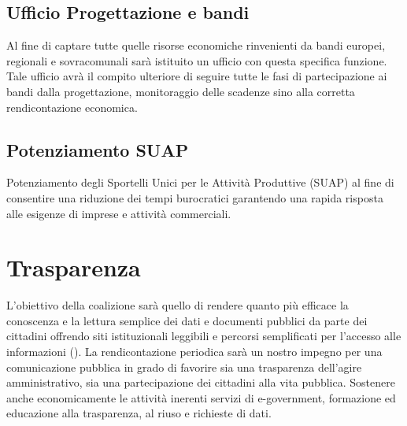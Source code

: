 \documentclass[a4paper,14pt,italian]{sphinxmanual}
\begin{document}
\section{Ufficio Progettazione e bandi}
\label{\detokenize{comune_efficiente:ufficio-progettazione-e-bandi}}
Al fine di captare tutte quelle risorse economiche rinvenienti da bandi europei, regionali e sovracomunali sarà istituito un ufficio con questa specifica funzione.
Tale ufficio avrà il compito ulteriore di seguire tutte le fasi di partecipazione ai bandi dalla progettazione, monitoraggio delle scadenze sino alla corretta rendicontazione economica.


\section{Potenziamento SUAP}
\label{\detokenize{comune_efficiente:potenziamento-suap}}
Potenziamento degli Sportelli Unici per le Attività Produttive (SUAP) al fine di consentire una riduzione dei tempi burocratici garantendo una rapida risposta alle esigenze di imprese e attività commerciali.


\chapter{Trasparenza}
\label{\detokenize{trasparenza:trasparenza}}\label{\detokenize{trasparenza::doc}}


L’obiettivo della coalizione sarà quello di rendere quanto più efficace la conoscenza e la lettura semplice dei dati e documenti pubblici da parte dei cittadini offrendo siti istituzionali leggibili e percorsi semplificati per l’accesso alle informazioni ().
La rendicontazione periodica sarà un nostro impegno per una comunicazione pubblica in grado di favorire sia una trasparenza dell’agire amministrativo, sia una partecipazione dei cittadini alla vita pubblica.
Sostenere anche economicamente le attività inerenti servizi di e-government, formazione ed educazione alla trasparenza, al riuso e richieste di dati.
\end{document}
